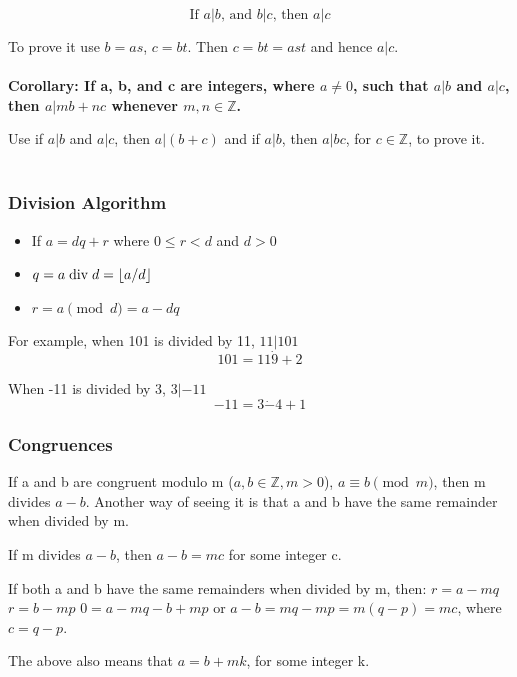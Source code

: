 \begin{equation}
\text{If $a|b$, and $b|c$, then $a|c$}
\end{equation}

To prove it use $b = as$, $c = bt$. Then $c = bt = ast$ and hence $a|c$.
\\~\\

\textbf{Corollary: If a, b, and c are integers, where $a \neq 0$, such that $a|b$ and $a|c$, then $a|mb + nc$ whenever $m, n \in \mathbb{Z}$.}

Use if $a|b$ and $a|c$, then $a|(b+c)$ and if $a|b$, then $a|bc$, for $c \in \mathbb{Z}$, to prove it.
\\~\\



\subsubsection{Division Algorithm}

\begin{itemize}
\item If $a = dq + r$ where $0 \leq r < d$ and $d>0$
\item $q = a \bdiv d = \lfloor a/d \rfloor$
\item $r = a \pmod d = a - dq$
\end{itemize}

For example, when 101 is divided by 11, $11|101$
$$
101 = 11 \dot 9 + 2
$$

When -11 is divided by 3, $3|-11$
$$
-11 = 3 \dot -4 + 1
$$



\subsubsection{Congruences}

If a and b are congruent modulo m ($a,b \in \mathbb{Z}, m >0$), $a \equiv b \pmod m$, then m divides $a-b$.
Another way of seeing it is that a and b have the same remainder when divided by m.

If m divides $a-b$, then $a-b = mc$ for some integer c.

If both a and b have the same remainders when divided by m, then:
$r = a - mq$ 
$r = b - mp$
$0 = a - mq - b + mp$ or $a - b = mq - mp = m(q-p) = mc$, where $c = q-p$.

The above also means that $a = b + mk$, for some integer k.

